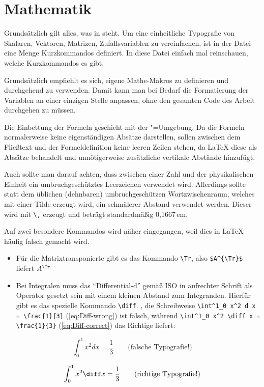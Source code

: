 \section{Mathematik}%
\label{sec:Mathe}
%
Grundsätzlich gilt alles, was in \parencites{ams1999a}{ams1999b} steht. 
Um eine einheitliche Typografie von
Skalaren, Vektoren, Matrizen,
Zufallsvariablen \etc zu vereinfachen, ist in der Datei
 eine Menge Kurzkommandos definiert.
In diese Datei einfach mal reinschauen, welche Kurzkommandos es gibt.

Grundsätzlich empfiehlt es sich, eigene Mathe-Makros zu definieren und durchgehend zu verwenden.
Damit kann man bei Bedarf die Formatierung der Variablen an einer einzigen Stelle anpassen,
ohne den gesamten Code des Arbeit durchgehen zu müssen.

Die Einbettung der Formeln geschieht mit der "=Umgebung.
Da die Formeln normalerweise keine eigenständigen Absätze darstellen,
sollen zwischen dem Fließtext und der Formeldefinition keine leeren Zeilen stehen,
da \LaTeX{} diese als Absätze behandelt und unnötigerweise zusätzliche vertikale Abstände hinzufügt.

Auch sollte man darauf achten, dass zwischen einer Zahl und der physikalischen Einheit ein umbruchgeschütztes Leerzeichen verwendet wird.
Allerdings sollte statt dem üblichen (dehnbaren) umbruchgeschützen Wortzwischenraum, 
welches mit einer Tilde erzeugt wird, ein schmälerer Abstand verwendet werden.
Dieser wird mit \verb+\,+  erzeugt und beträgt standardmäßig 0,1667\,em. %
%

Auf zwei besondere Kommandos wird näher eingegangen,
weil dies in \LaTeX{} häufig falsch gemacht wird.
\begin{itemize}
  \item Für die Matrixtransponierte gibt es das Kommando \verb#\Tr#, also
	\verb#$A^{\Tr}$# liefert $A^{\Tr}$	
	\item \justifying Bei Integralen muss das \enquote{Differential-d} gemäß
	ISO in aufrechter Schrift als Operator gesetzt sein mit einem kleinen Abstand
	zum Integranden. Hierfür gibt es das spezielle Kommando \verb#\diff#.
	\Dhe, die Schreibweise \verb#\int^1_0 x^2 d x = \frac{1}{3}# (\cref{eq:Diff-wrong}) ist falsch,
	während \verb#\int^1_0 x^2 \diff x = \frac{1}{3}# (\cref{eq:Diff-correct}) das Richtige liefert:
\end{itemize}

\begin{equation}
	\int^1_0 x^2 d x = \frac{1}{3} \qquad \text{(falsche Typografie!)}
	\label{eq:Diff-wrong}
\end{equation}

\begin{equation}
	\int^1_0 x^2 \diff x = \frac{1}{3} \qquad \text{(richtige Typografie!)}
	\label{eq:Diff-correct}
\end{equation}

